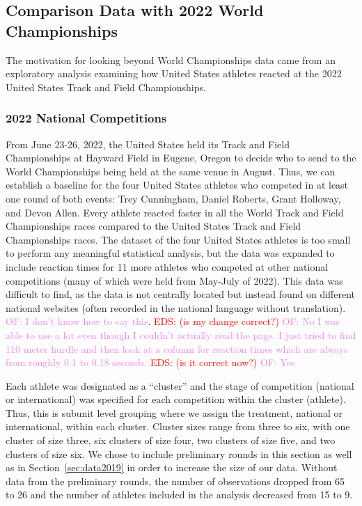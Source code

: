 \documentclass[12pt, letterpaper, titlepage]{article}
\newcommand{\eds}[1]{\textcolor{red}{EDS: (#1)}}
\newcommand{\of}[1]{\textcolor{violet}{OF: #1}}
\begin{document}
\subsection{Comparison Data with 2022 World Championships}\label{sec:databeyond}
The motivation for looking beyond World Championships data came from an 
exploratory analysis examining how United States athletes reacted at the 
2022 United States Track and Field Championships.


\subsubsection{2022 National Competitions}\label{sec:datanational}
From June 23-26, 2022, the United States held its Track and Field Championships 
at Hayward Field in Eugene, Oregon to decide who to send to the World 
Championships being held at the same venue in August. Thus, we can establish a 
baseline for the four United States athletes who competed in at least one round 
of both events: Trey Cunningham, Daniel Roberts, Grant Holloway, and Devon Allen.   
Every athlete reacted faster in all the World Track and Field Championships 
races compared to the United States Track and Field Championships races. The 
dataset of the four United States athletes is too small to perform any 
meaningful statistical analysis, but the data was expanded to include reaction 
times for 11 more athletes who competed at other national competitions (many of which were 
held from May-July of 2022). This data was difficult to find, as the data is not
centrally located but instead found on different national websites (often 
recorded in the national language without translation). 
\of{I don't know how to say this}. \eds{is my change correct?} \of{No I was able
to use a lot even though I couldn't actually read the page. I just tried to find
110 meter hurdle and then look at a column for reaction times which are always from
roughly 0.1 to 0.18 seconds.} \eds{is it correct now?} \of{Yes}


Each athlete was designated as a ``cluster'' and the stage of competition (national
or international) was specified for each competition within the cluster (athlete).
Thus, this is subunit level grouping where we assign the treatment, national or
international, within each cluster.  Cluster sizes range from three to six, with
one cluster of size three, six clusters of size four, two clusters of size five,
and two clusters of size six. We chose to include preliminary rounds in this
section as well as in Section~\ref{sec:data2019} in order to increase the size 
of our data.  Without data from the preliminary rounds, the number of observations
dropped from 65 to 26 and the number of athletes included in the analysis
decreased from 15 to 9.
\end{document}
